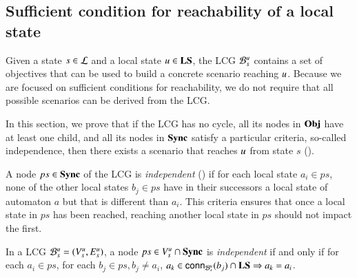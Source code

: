 

\subsection{Sufficient condition for reachability of a local state}
\label{ssec:ua}

Given a state $s \in \mathcal{L}$ and a local state $u\in\mathbf{LS}$, the LCG ${\mathcal{B}_{s}^{u}}$ contains a set of objectives
that can be used to build a concrete scenario reaching $u$.
Because we are focused on sufficient conditions for reachability, we do not require that all
possible scenarios can be derived from the LCG.

In this section, we prove that if the LCG has no cycle, all its nodes in $\mathbf{Obj}$ have at least one
child, and all its nodes in $\mathbf{Sync}$ satisfy a
particular criteria, so-called independence,
then there exists a scenario that reaches $u$ from state $s$ ().

A node $ps \in \mathbf{Sync}$ of the LCG is \emph{independent} () if for each local state
$a_i\in ps$, none of the other local states $b_j\in ps$ have in their successors
a local state of automaton $a$ but that is different than $a_i$.
This criteria ensures that once a local state in $ps$ has been reached, reaching another local state
in $ps$ should not impact the first.

\begin{definition}
\label{def:coherent}
  In a LCG ${\mathcal{B}_{s}^{u}} = ({V_s^u}, {E_s^u})$,
  a node $ps \in {V_s^u}\cap\mathbf{Sync}$ is \emph{independent} if and only if
  for each $a_i\in ps$,
  for each $b_j\in ps, b_j\neq a_i$,
  $a_k \in\mathsf{conn}_{{\mathcal{B}_{s}^{u}}}(b_j) \cap \mathbf{LS} \Rightarrow a_k = a_i$.
\end{definition}


